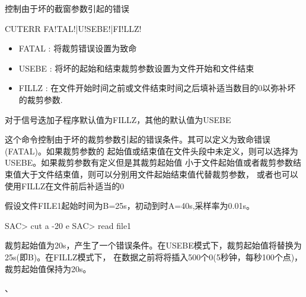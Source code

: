 \label{cmd:cuterr}

控制由于坏的截窗参数引起的错误

\begin{SACSTX}
CUTERR FA!TAL!|U!SEBE!|FI!LLZ!
\end{SACSTX}

\begin{itemize}
\item FATAL : 将裁剪错误设置为致命
\item USEBE : 将坏的起始和结束裁剪参数设置为文件开始和文件结束 
\item FILLZ : 在文件开始时间之前或文件结束时间之后填补适当数目的0以弥补坏的裁剪参数.
\end{itemize}

对于信号迭加子程序默认值为FILLZ，其他的默认值为USEBE

这个命令控制由于坏的裁剪参数引起的错误条件。其可以定义为致命错误(FATAL)。如果裁剪参数的
起始值或结束值在文件头段中未定义，则可以选择为USEBE。如果裁剪参数有定义但是其裁剪起始值
小于文件起始值或者裁剪参数结束值大于文件结束值，则可以分别用文件起始结束值代替裁剪参数，
或者也可以使用FILLZ在文件前后补适当的0

假设文件FILE1起始时间为B=25s，初动到时A=40s,采样率为0.01s。
\begin{SACCode}
SAC> cut a -20 e
SAC> read file1
\end{SACCode}
裁剪起始值为20s，产生了一个错误条件。在USEBE模式下，裁剪起始值将替换为25s(即B)。在FILLZ模式下，
在数据之前将将插入500个0(5秒钟，每秒100个点)，裁剪起始值保持为20s。

、
